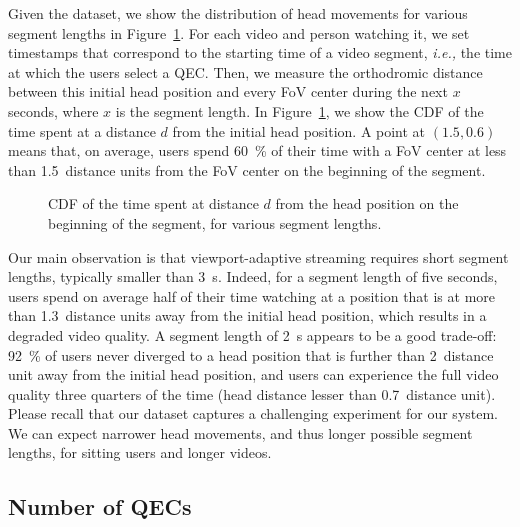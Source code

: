 Given the dataset, we show the distribution of head movements for
various segment lengths in Figure~\ref{cdf-dataset}. For each video
and person watching it, we set timestamps that correspond to the
starting time of a video segment, \textit{i.e.,} the time at which the
users select a \ac{QEC}. Then, we measure the orthodromic distance
between this initial head position and every \ac{FoV} center during
the next $x$ seconds, where $x$ is the segment length. In
Figure~\ref{cdf-dataset}, we show the \ac{CDF} of the time spent at a
distance $d$ from the initial head position.
A point at $(1.5,0.6)$
means that, on average, users spend \SI{60}{\percent} of their time
with a \ac{FoV} center at less than \num{1.5}~distance units from the
\ac{FoV} center on the beginning of the segment.

\begin{figure}
\centering

\caption{CDF of the time spent at distance $d$ from the head position on the beginning of the
segment, for various segment lengths.}\label{cdf-dataset}
\end{figure}

Our main observation is that viewport-adaptive streaming requires
short segment lengths, typically smaller than \SI{3}{\second}. Indeed,
for a segment length of five seconds, users spend on average half of
their time watching at a position that is at more than
\num{1.3}~distance units away from the initial head position, which
results in a degraded video quality. A segment length of
\SI{2}{\second} appears to be a good trade-off: \SI{92}{\percent} of
users never diverged to a head position that is further than
\num{2}~distance unit away from the initial head position, and users
can experience the full video quality three quarters of the time (head distance
lesser than \num{0.7}~distance unit). Please recall that our dataset
captures a challenging experiment for our system. We can expect
narrower head movements, and thus longer possible segment lengths, for
sitting users and longer videos.


\subsection{Number of \acp{QEC}}

